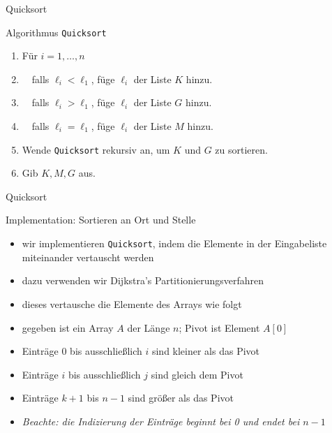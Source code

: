 \documentclass[aspectratio=1610, 11pt]{beamer}
\begin{document}
\begin{frame}{Quicksort}
\begin{exampleblock}{Algorithmus \tt Quicksort}
	\begin{enumerate}
		\item F\"ur $i=1,\ldots,n$
		\item $\quad$falls $\ell_i<\ell_1$, f\"uge $\ell_i$ der Liste $K$ hinzu.
		\item $\quad$falls $\ell_i>\ell_1$, f\"uge $\ell_i$ der Liste $G$ hinzu.
		\item $\quad$falls $\ell_i=\ell_1$, f\"uge $\ell_i$ der Liste $M$ hinzu.
		\item Wende {\tt Quicksort} rekursiv an, um $K$ und $G$ zu sortieren.
		\item Gib $K,M,G$ aus.
	\end{enumerate}
	\end{exampleblock}
\end{frame}

\begin{frame}{Quicksort}
\begin{exampleblock}{Implementation: Sortieren an Ort und Stelle}
	\begin{itemize}
		\item wir implementieren {\tt Quicksort}, indem die Elemente in der Eingabeliste miteinander vertauscht werden
		\item dazu verwenden wir Dijkstra's Partitionierungsverfahren
		\item dieses vertausche die Elemente des Arrays wie folgt
		\item gegeben ist ein Array $A$ der L\"ange $n$; Pivot ist Element $A[0]$
		\item Eintr\"age $0$ bis ausschlie\ss lich $i$ sind kleiner als das Pivot
		\item Eintr\"age $i$ bis ausschlie\ss lich $j$ sind gleich dem Pivot
		\item Eintr\"age $k+1$ bis $n-1$ sind gr\"o\ss er als das Pivot
		\item \em Beachte: die Indizierung der Eintr\"age beginnt bei 0 und endet bei $n-1$
	\end{itemize}
	\end{exampleblock}
\end{frame}
\end{document}
